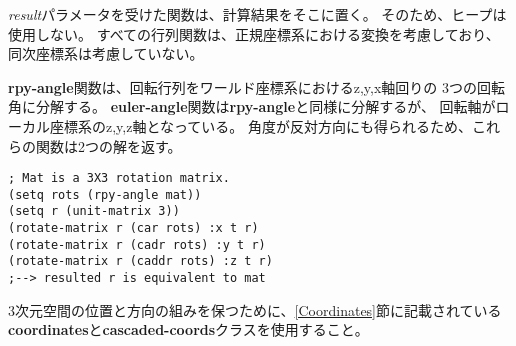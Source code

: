 {\em result}パラメータを受けた関数は、計算結果をそこに置く。
そのため、ヒープは使用しない。
すべての行列関数は、正規座標系における変換を考慮しており、
同次座標系は考慮していない。

{\bf rpy-angle}関数は、回転行列をワールド座標系におけるz,y,x軸回りの
3つの回転角に分解する。
{\bf euler-angle}関数は{\bf rpy-angle}と同様に分解するが、
回転軸がローカル座標系のz,y,z軸となっている。
角度が反対方向にも得られるため、これらの関数は2つの解を返す。

\begin{verbatim}
; Mat is a 3X3 rotation matrix.
(setq rots (rpy-angle mat))
(setq r (unit-matrix 3))
(rotate-matrix r (car rots) :x t r)
(rotate-matrix r (cadr rots) :y t r)
(rotate-matrix r (caddr rots) :z t r)
;--> resulted r is equivalent to mat
\end{verbatim}

3次元空間の位置と方向の組みを保つために、\ref{Coordinates}節に記載されている
{\bf coordinates}と{\bf cascaded-coords}クラスを使用すること。

